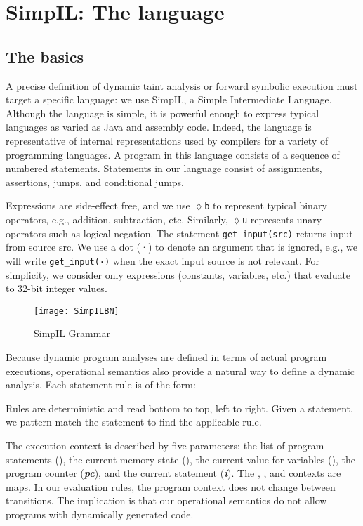\section{SimpIL: The language}
\subsection{The basics}
A precise definition of dynamic taint analysis or forward symbolic execution must target a specific language: we use SimpIL, a Simple Intermediate Language. Although the language is simple, it is powerful enough to express typical languages as varied as Java and assembly code. Indeed, the language is representative of internal representations used by compilers for a variety of programming languages. A program in this language consists of a sequence of numbered statements. Statements in our language consist of assignments, assertions, jumps, and conditional jumps.

Expressions are side-effect free, and we use \texttt{$\lozenge$b} to represent typical binary operators, e.g., addition, subtraction, etc. Similarly, \texttt{$\lozenge$u} represents unary operators such as logical negation. The statement \texttt{get\_input(src)} returns input from source src. We use a dot (·) to denote an argument that is ignored, e.g., we will write \texttt{get\_input(·)} when the exact input source is not relevant. For simplicity, we consider only expressions (constants, variables, etc.) that evaluate to 32-bit integer values.

\begin{figure}[h]
	\caption{SimpIL Grammar}
	\centering
	\texttt{[image: SimpILBN]}
\end{figure}

Because dynamic program analyses are defined in terms of actual program executions, operational semantics also provide a natural way to define a dynamic analysis. Each statement rule is of the form:
\begin{prooftree}
\end{prooftree}
Rules are deterministic and read bottom to top, left to right. Given a statement, we pattern-match the statement to find the applicable rule.

The execution context is described by five parameters: the list of program statements (\bm{$\sum$}), the current memory state (\bm{$\mu$}), the current value for variables (\bm{$\Delta$}), the program counter (\textbf{\textit{pc}}), and the current statement (\textbf{\textit{i}}). The \bm{$\sum$}, \bm{$\mu$}, and \bm{$\Delta$} contexts are maps. In our evaluation rules, the program context \bm{$\sum$} does not change between transitions. The implication is that our operational semantics do not allow programs with dynamically generated code.
